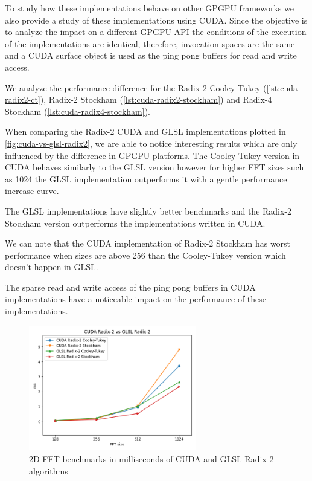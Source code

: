 \documentclass[
  oneside,
  11pt, a4paper,
  footinclude=true,
  headinclude=true,
  cleardoublepage=empty
]{scrbook}
\begin{document}
To study how these implementations behave on other GPGPU frameworks we also provide a study of these implementations using CUDA. Since the objective is to analyze the impact on a different GPGPU API the conditions of the execution of the implementations are identical, therefore, invocation spaces are the same and a CUDA surface object is used as the ping pong buffers for read and write access.

We analyze the performance difference for the Radix-2 Cooley-Tukey (\autoref{lst:cuda-radix2-ct}), Radix-2 Stockham (\autoref{lst:cuda-radix2-stockham}) and Radix-4 Stockham (\autoref{lst:cuda-radix4-stockham}).

When comparing the Radix-2 CUDA and GLSL implementations plotted in \autoref{fig:cuda-vs-glsl-radix2}, we are able to notice interesting results which are only influenced by the difference in GPGPU platforms. The Cooley-Tukey version in CUDA behaves similarly to the GLSL version however for higher FFT sizes such as 1024 the GLSL implementation outperforms it with a gentle performance increase curve.

The GLSL implementations have slightly better benchmarks and the Radix-2 Stockham version outperforms the implementations written in CUDA.

We can note that the CUDA implementation of Radix-2 Stockham has worst performance when sizes are above 256 than the Cooley-Tukey version which doesn't happen in GLSL.

The sparse read and write access of the ping pong buffers in CUDA implementations have a noticeable impact on the performance of these implementations.

\begin{figure}[H] 
    \centering
    \includegraphics[width=0.65\textwidth]{img/results/cuda_vs_glsl_radix2.png}
    \caption{2D FFT benchmarks in milliseconds of CUDA and GLSL Radix-2 algorithms}
    \label{fig:cuda-vs-glsl-radix2}
\end{figure}
\end{document}
